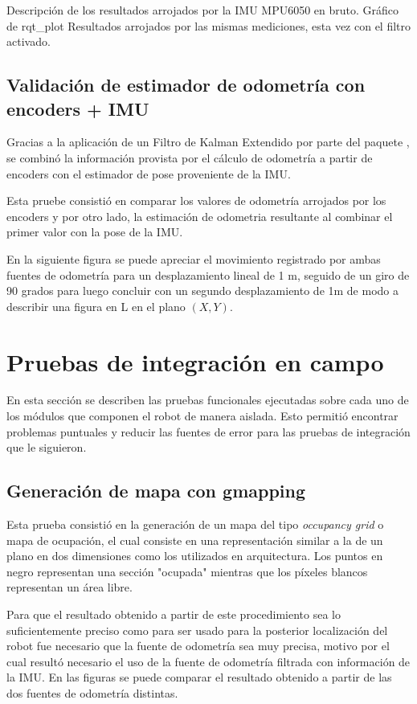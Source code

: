Descripción de los resultados arrojados por la IMU MPU6050 en bruto. Gráfico de rqt\_plot
Resultados arrojados por las mismas mediciones, esta vez con el filtro activado.

\subsection{Validación de estimador de odometría con encoders + IMU}

Gracias a la aplicación de un Filtro de Kalman Extendido por parte del paquete , se combinó la información provista por el cálculo de odometría a partir de encoders con el estimador de pose proveniente de la IMU.

Esta pruebe consistió en comparar los valores de odometría arrojados por los encoders y por otro lado, la estimación de odometria resultante al combinar el primer valor con la pose de la IMU.

En la siguiente figura se puede apreciar el movimiento registrado por ambas fuentes de odometría para un desplazamiento lineal de 1 m, seguido de un giro de 90 grados para luego concluir con un segundo desplazamiento de 1m de modo a describir una figura en L en el plano $(X,Y)$.

\section{Pruebas de integración en campo}

En esta sección se describen las pruebas funcionales ejecutadas sobre cada uno de los módulos que componen el robot de manera aislada. Esto permitió encontrar problemas puntuales y reducir las fuentes de error para las pruebas de integración que le siguieron.

\subsection{Generación de mapa con gmapping}

Esta prueba consistió en la generación de un mapa del tipo \textit{occupancy grid} o mapa de ocupación, el cual consiste en una representación similar a la de un plano en dos dimensiones como los utilizados en arquitectura. Los puntos en negro representan una sección "ocupada" mientras que los píxeles blancos representan un área libre.

Para que el resultado obtenido a partir de este procedimiento sea lo suficientemente preciso como para ser usado para la posterior localización del robot fue necesario que la fuente de odometría sea muy precisa, motivo por el cual resultó necesario el uso de la fuente de odometría filtrada con información de la IMU. En las figuras se puede comparar el resultado obtenido a partir de las dos fuentes de odometría distintas.

